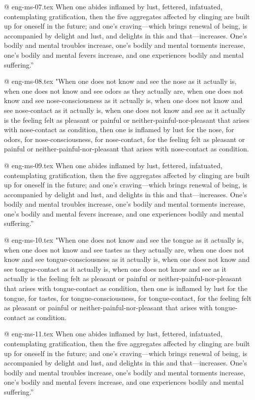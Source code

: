 @ eng-ms-07.tex
When one abides inflamed by lust, fettered, infatuated, contemplating gratification, then the five aggregates affected by clinging are built up for oneself in the future; and one’s craving—which brings renewal of being, is accompanied by delight and lust, and delights in this and that—increases. One’s bodily and mental troubles increase, one’s bodily and mental torments increase, one’s bodily and mental fevers increase, and one experiences bodily and mental suffering.”

@ eng-ms-08.tex
"When one does not know and see the nose as it actually is, when one does not know and see odors as they actually are, when one does not know and see nose-consciousness as it actually is, when one does not know and see nose-contact as it actually is, when one does not know and see as it actually is the feeling felt as pleasant or painful or neither-painful-nor-pleasant that arises with nose-contact as condition, then one is inflamed by lust for the nose, for odors, for nose-consciousness, for nose-contact, for the feeling felt as pleasant or painful or neither-painful-nor-pleasant that arises with nose-contact as condition.

@ eng-ms-09.tex
When one abides inflamed by lust, fettered, infatuated, contemplating gratification, then the five aggregates affected by clinging are built up for oneself in the future; and one’s craving—which brings renewal of being, is accompanied by delight and lust, and delights in this and that—increases. One’s bodily and mental troubles increase, one’s bodily and mental torments increase, one’s bodily and mental fevers increase, and one experiences bodily and mental suffering.”

@ eng-ms-10.tex
"When one does not know and see the tongue as it actually is, when one does not know and see tastes as they actually are, when one does not know and see tongue-consciousness as it actually is, when one does not know and see tongue-contact as it actually is, when one does not know and see as it actually is the feeling felt as pleasant or painful or neither-painful-nor-pleasant that arises with tongue-contact as condition, then one is inflamed by lust for the tongue, for tastes, for tongue-consciousness, for tongue-contact, for the feeling felt as pleasant or painful or neither-painful-nor-pleasant that arises with tongue-contact as condition.

@ eng-ms-11.tex
When one abides inflamed by lust, fettered, infatuated, contemplating gratification, then the five aggregates affected by clinging are built up for oneself in the future; and one’s craving—which brings renewal of being, is accompanied by delight and lust, and delights in this and that—increases. One’s bodily and mental troubles increase, one’s bodily and mental torments increase, one’s bodily and mental fevers increase, and one experiences bodily and mental suffering.”

